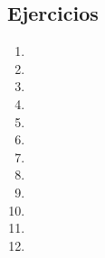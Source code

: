 \subsection{Ejercicios}

\begin{enumerate}
    \item 
    \item 
    \item 
    \item 
    \item 
    \item 
    \item 
    \item 
    \item 
    \item 
    \item 
    \item 
\end{enumerate}